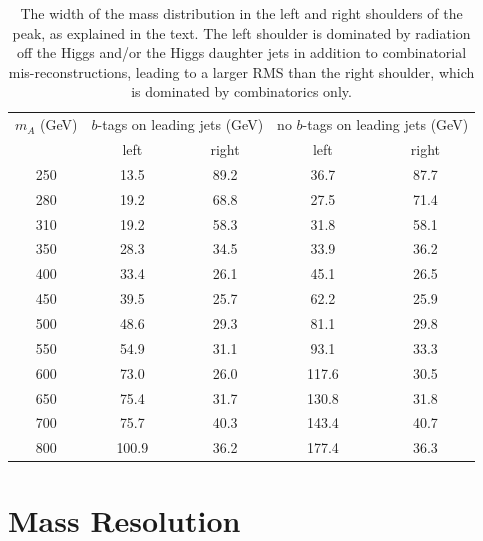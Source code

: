 \begin{table}
\centering
\caption{The width of the mass distribution in the left and right shoulders of the peak,
    as explained in the text.  The left shoulder is dominated by radiation off the Higgs
    and/or the Higgs daughter jets in addition to combinatorial mis-reconstructions,
    leading to a larger RMS than the right shoulder, which
    is dominated by combinatorics only.\label{tab:signal_mass_RMS_compare}   }
  \begin{tabular}{ccccc}
     \hline \hline
     $m_A$ (GeV) & \multicolumn{2}{c}{$b$-tags on leading jets (GeV)} & \multicolumn{2}{c}{no $b$-tags on leading jets (GeV)}  \\
        & left & right & left & right \\ \hline
     250 & 13.5 & 89.2 & 36.7 & 87.7 \\
     280 & 19.2 & 68.8 & 27.5 & 71.4 \\
     310 & 19.2 & 58.3 & 31.8 & 58.1 \\
     350 & 28.3 & 34.5 & 33.9 & 36.2 \\
     400 & 33.4 & 26.1 & 45.1 & 26.5 \\
     450 & 39.5 & 25.7 & 62.2 & 25.9 \\
     500 & 48.6 & 29.3 & 81.1 & 29.8 \\
     550 & 54.9 & 31.1 & 93.1 & 33.3 \\
     600 & 73.0 & 26.0 & 117.6 & 30.5 \\
     650 & 75.4 & 31.7 & 130.8 & 31.8 \\
     700 & 75.7 & 40.3 & 143.4 & 40.7 \\
     800 & 100.9 & 36.2 & 177.4 & 36.3 \\
     \hline     \end{tabular}
\end{table}








\section{Mass Resolution}
\label{sec:mass_res}


